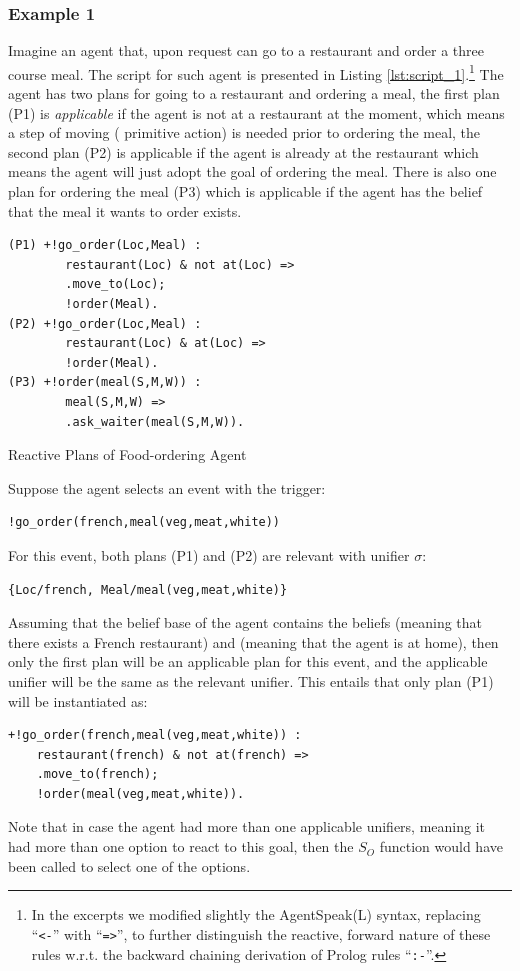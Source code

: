 \subsubsection*{Example 1}
Imagine an agent that, upon request can go to a restaurant and order a three course meal. The script for such agent is presented in Listing \ref{lst:script_1}.\footnote{In the excerpts we modified slightly the AgentSpeak(L) syntax, replacing ``\texttt{<-}'' with ``\texttt{=>}'', to further distinguish the reactive, forward nature of these rules w.r.t. the backward chaining derivation of Prolog rules ``\texttt{:-}''.} The agent has two plans for going to a restaurant and ordering a meal, the first plan (P1) is \textit{applicable} if the agent is not at a restaurant at the moment, which means a step of moving ( primitive action) is needed prior to ordering the meal, the second plan (P2) is applicable if the agent is already at the restaurant which means the agent will just adopt the goal of ordering the meal. There is also one plan for ordering the meal (P3) which is applicable if the agent has the belief that the meal it wants to order exists.
\begin{listing}[t]
\centering
\begin{verbatim}
(P1) +!go_order(Loc,Meal) :
        restaurant(Loc) & not at(Loc) =>
        .move_to(Loc);
        !order(Meal).
(P2) +!go_order(Loc,Meal) :
        restaurant(Loc) & at(Loc) => 
        !order(Meal). 
(P3) +!order(meal(S,M,W)) : 
        meal(S,M,W) => 
        .ask_waiter(meal(S,M,W)).
\end{verbatim}
    \caption{Reactive Plans of Food-ordering Agent}
    \label{lst:script_1}
\end{listing}%
\noindent Suppose the agent selects an event with the trigger: 
\begin{verbatim}
!go_order(french,meal(veg,meat,white))
\end{verbatim}
For this event, both plans (P1) and (P2) are relevant with unifier $\sigma$:
\begin{verbatim}
{Loc/french, Meal/meal(veg,meat,white)}
\end{verbatim}
Assuming that the belief base of the agent contains the beliefs  (meaning that there exists a French restaurant) and  (meaning that the agent is at home), then only the first plan will be an applicable plan for this event, and the applicable unifier will be the same as the relevant unifier. This entails that only plan (P1) will be instantiated as: 
\begin{verbatim}
+!go_order(french,meal(veg,meat,white)) :
    restaurant(french) & not at(french) =>
    .move_to(french);
    !order(meal(veg,meat,white)).
\end{verbatim}
Note that in case the agent had more than one applicable unifiers, meaning it had more than one option to react to this goal, then the $S_O$ function would have been called to select one of the options. 

